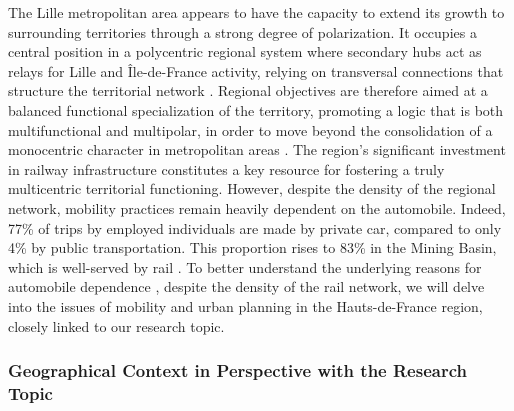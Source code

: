 \begin{refsegment}
The Lille metropolitan area appears to have the capacity to extend its growth to surrounding territories through a strong degree of polarization. It occupies a central position in a polycentric regional system where secondary hubs act as relays for Lille and Île-de-France activity, relying on transversal connections that structure the territorial network \textcolor{blue}{\autocite[43, 46]{adulm_metropolisation_2016}}. Regional objectives are therefore aimed at a balanced functional specialization of the territory, promoting a logic that is both multifunctional and multipolar, in order to move beyond the consolidation of a monocentric character in metropolitan areas \textcolor{blue}{\autocite[144]{lo_feudo_scenario_2014}}. The region's significant investment in railway infrastructure constitutes a key resource for fostering a truly multicentric territorial functioning. However, despite the density of the regional network, mobility practices remain heavily dependent on the automobile. Indeed, 77\% of trips by employed individuals are made by private car, compared to only 4\% by public transportation. This proportion rises to 83\% in the Mining Basin, which is well-served by rail \textcolor{blue}{\autocite{michel_voiture_2016}}. To better understand the underlying reasons for automobile dependence \textcolor{blue}{\autocites[74]{motte-baumvol_territoires_2014}[4]{gallez_dependance_2018}}, despite the density of the rail network, we will delve into the issues of mobility and urban planning in the Hauts-de-France region, closely linked to our research topic.%

\subsubsection*{Geographical Context in Perspective with the Research Topic
    \label{chap3:region-hdf-intermodalite-tc}
    }


\end{refsegment}
